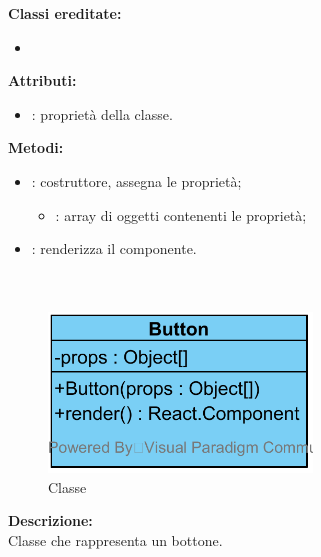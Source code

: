
\textbf{Classi ereditate:}
\begin{itemize}
	\item {}
\end{itemize}


\textbf{Attributi:}
\begin{itemize}
	\item {}: proprietà della classe.
\end{itemize}

\textbf{Metodi:}
\begin{itemize}
	\item {}: costruttore, assegna le proprietà;
	\begin{itemize}
		\item {}: array di oggetti contenenti le proprietà;
	\end{itemize}
	\item {}: renderizza il componente.
\end{itemize}

\paragraph[::Button]{\class}\mbox{}\\ \label{\class}
\begin{figure}[H]
	\centering
	\includegraphics[width=7cm]{./diagrammi/framework/view/gui/button.png}
	\caption{Classe \class}
\end{figure}
\textbf{Descrizione:}\\
Classe che rappresenta un bottone.

